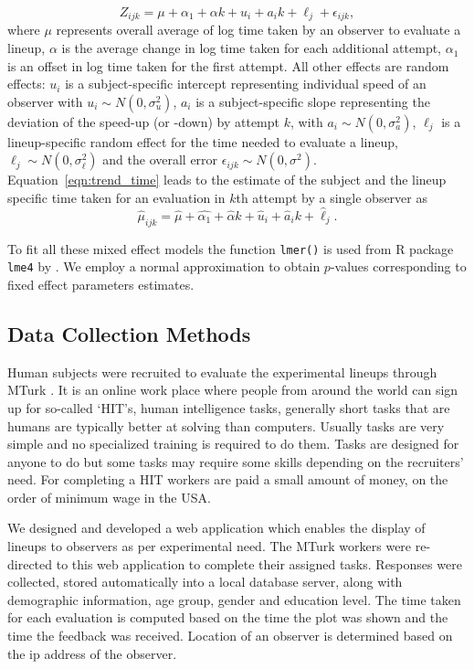 \documentclass[10pt]{article}\usepackage[]{graphicx}\usepackage[]{xcolor}
\begin{document}
\begin{equation} \label{eqn:trend_time}
Z_{ijk} = \mu + \alpha_1 + \alpha k + u_i +  a_{i} k + \ell_j + \epsilon_{ijk},  
\end{equation}
where $\mu$ represents overall average of log time taken by an observer to evaluate a lineup, $\alpha$ is the average change in log time taken for each additional attempt,  $\alpha_1$ is an offset in log time taken for the first attempt. All other effects are random effects: $u_i$ is a subject-specific intercept representing individual speed of an observer with $u_i \sim N(0, \sigma_u^2)$, $a_i$ is a subject-specific slope representing the deviation of the speed-up (or -down) by attempt $k$, with $a_i \sim N(0, \sigma_a^2)$, $\ell_j$ is a lineup-specific random effect for the time needed to evaluate a lineup, $\ell_j \sim N(0, \sigma_\ell^2)$ and the overall error $\epsilon_{ijk} \sim N(0, \sigma^2)$.
Equation~\ref{eqn:trend_time} leads to the estimate of the subject and the lineup specific time taken for an evaluation in $k$th attempt by a single observer as 
\begin{equation} \label{eqn:trend_time_est}
\hat \mu_{ijk} =  \hat{\mu} + \hat{\alpha_1}+ \hat{\alpha}k + \hat{u}_i +  \hat{a}_i k + \hat{\ell}_j.
\end{equation}

To fit all these mixed effect models the function {\tt lmer()} is used from R package {\tt lme4} by \cite{lme4:2015, lme4:paper}. We employ a normal approximation to obtain $p$-values corresponding to fixed effect parameters estimates.  


\subsection{Data Collection Methods}  Human subjects were recruited to evaluate the experimental lineups through MTurk \citep{turk}.  It is an online work place where people from around the world can sign up for so-called `HIT's, human intelligence tasks, generally short tasks that are humans are typically better at solving than computers. Usually tasks are very simple and no specialized training is required to do them. Tasks are designed for anyone to do but some tasks may require some skills depending on the recruiters' need. %
 For completing a HIT workers are paid a small amount of money, on the order of minimum wage in the USA. 


We designed and developed a web application which enables the display of lineups to  observers as per experimental need. The MTurk workers were re-directed to this web application to complete their assigned tasks. Responses were collected, stored automatically into a local database server, along with demographic information, age group, gender and education level. The time taken for each evaluation is computed based on the time the plot was shown and the time the feedback was received. Location of an observer is determined based on the ip address of the observer.
\end{document}
